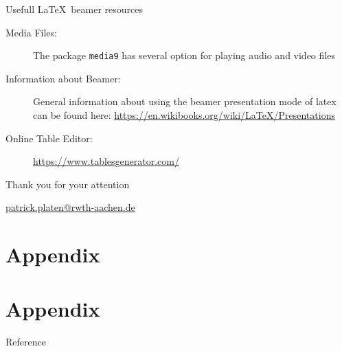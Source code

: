 \documentclass[xcolor=table,mathserif,9pt]{beamer}    %
\newcommand{\backupbegin}{
   \newcounter{finalframe}
   \setcounter{finalframe}{\value{framenumber}}
}
\newcommand{\backupend}{
   \setcounter{framenumber}{\value{finalframe}}
}
\newcommand{\stoptocwriting}{%
  \addtocontents{toc}{\protect\setcounter{tocdepth}{-5}}}
\newcommand{\resumetocwriting}{%
  \addtocontents{toc}{\protect\setcounter{tocdepth}{2}}}
\begin{document}
\begin{frame}{Usefull \LaTeX\ beamer resources}
\begin{description}
\item [Media Files:] The package \texttt{media9} has several option for playing audio and video files
\item [Information about Beamer:] General information about using the beamer presentation mode of latex can be found here: \url{https://en.wikibooks.org/wiki/LaTeX/Presentations}
\item [Online Table Editor:] \url{https://www.tablesgenerator.com/}
\end{description}
\end{frame}


\begin{frame}[label=finalSlide]
  \label{LastPage}%
  \begin{center}
    \vfill
    {\Large
    \textcolor{i6bluedark}{Thank you for your attention}
    }
    \vfill
    {\insertauthor}

    \vspace{10mm}
    \url{patrick.platen@rwth-aachen.de}
  \end{center}
\end{frame}

\nocite{*}

\stoptocwriting
\section{Appendix}
\resumetocwriting



\section*{Appendix}




\begin{frame}[allowframebreaks]
  \centerline{Reference}
 
 
\end{frame}

\end{document}
